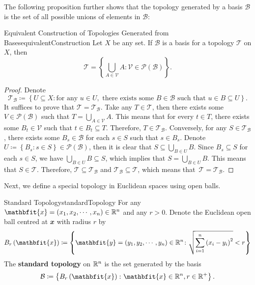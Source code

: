 \documentclass[math, code]{amznotes}
\theoremstyle{remark}
\begin{document}
The following proposition further shows that the topology generated by a basis $\mathcal{B}$ is the set of all possible unions of elements in $\mathcal{B}$:
\begin{probox}{\small Equivalent Construction of Topologies Generated from Bases}{equivalentConstruction}
    Let $X$ be any set. If $\mathcal{B}$ is a basis for a topology $\mathcal{T}$ on $X$, then 
    \begin{equation*}
        \mathcal{T} = \left\{\bigcup_{A \in \mathcal{V}} A  \colon \mathcal{V}\in \mathcal{P}\left(\mathcal{B}\right)\right\}.
    \end{equation*}
    \tcblower
    \begin{proof}
        Denote 
        \begin{equation*}
            \mathcal{T}_{\mathcal{B}} \coloneqq \left\{U \subseteq X \colon \textrm{for any } u \in U, \textrm{ there exists some } B \in \mathcal{B} \textrm{ such that } u \in B \subseteq U\right\}.
        \end{equation*}
        It suffices to prove that $\mathcal{T} = \mathcal{T}_{\mathcal{B}}$. Take any $T \in \mathcal{T}$, then there exists some $V \in \mathcal{P}\left(\mathcal{B}\right)$ such that $T = \bigcup_{A \in \mathcal{V}}A$. This means that for every $t \in T$, there exists some $B_t \in \mathcal{V}$ such that $t \in B_t \subseteq T$. Therefore, $T \in \mathcal{T}_{\mathcal{B}}$. Conversely, for any $S \in \mathcal{T}_{\mathcal{B}}$, there exists some $B_s \in \mathcal{B}$ for each $s \in S$ such that $s \in B_s$. Denote $U \coloneqq \left\{B_s \colon s \in S\right\} \in \mathcal{P}\left(\mathcal{B}\right)$, then it is clear that $S \subseteq \bigcup_{B \in U}B$. Since $B_s \subseteq S$ for each $s \in S$, we have $\bigcup_{B \in U}B \subseteq S$, which implies that $S = \bigcup_{B \in U}B$. This means that $S \in \mathcal{T}$. Therefore, $\mathcal{T} \subseteq \mathcal{T}_{\mathcal{B}}$ and $\mathcal{T}_{\mathcal{B}} \subseteq \mathcal{T}$, which means that~$\mathcal{T} = \mathcal{T}_{\mathcal{B}}$.
    \end{proof}
\end{probox}
Next, we define a special topology in Euclidean spaces using open balls.
\begin{dfnbox}{Standard Topology}{standardTopology}
    For any $\mathbfit{x} = \left(x_1, x_2, \cdots, x_n\right) \in \R^n$ and any $r > 0$. Denote the Euclidean open ball centred at $\mathbfit{x}$ with radius $r$ by
    \begin{equation*}
        B_{r}\left(\mathbfit{x}\right) \coloneqq \left\{\mathbfit{y} = \left(y_1, y_2, \cdots, y_n\right) \in \R^n \colon \sqrt{\sum_{i = 1}^{n}\left(x_i - y_i\right)^2} < r\right\}
    \end{equation*} 
    The {\color{red} \textbf{standard topology}} on $\mathbb{R}^n$ is the set generated by the basis
    \begin{equation*}
        \mathcal{B} \coloneqq \left\{B_{r}\left(\mathbfit{x}\right) \colon \mathbfit{x} \in \R^n, r \in \R^+\right\}.
    \end{equation*}
\end{dfnbox}
\end{document}
